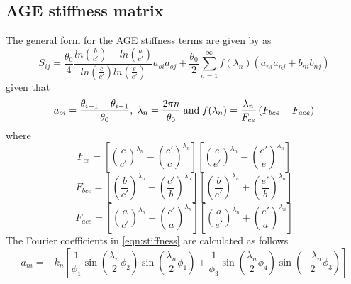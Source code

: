 \subsection{AGE stiffness matrix}
\label{AGE_stiffness}
The general form for the AGE stiffness terms are given by \cite{razek_1982} as
\begin{equation}\label{eqn:stiffness}
    S_{ij}=\frac{\theta_{0}}{4}\frac
    {ln\left(\frac{b}{c'}\right) - ln\left(\frac{a}{c'}\right)}
    {ln\left(\frac{c}{c'}\right)   ln\left(\frac{e}{e'}\right)}a_{oi}a_{oj} +
    \frac{\theta_{0}}{2}\sum^{\infty}_{n=1}f(\lambda_{n})
    \left(a_{ni}a_{nj}+b_{ni}b_{nj}\right)
\end{equation}
given that
\begin{equation}\label{eqn:func_aoi_lambda}
    a_{oi}=\frac{\theta_{i+1}-\theta_{i-1}}{\theta_{0}}, \; 
    \lambda_{n}=\frac{2\pi n}{\theta_{0}}
    \; \textnormal{and} \;
    f(\lambda_{n})=\frac{\lambda_{n}}{F_{ce}}\left(F_{bce}-F_{ace}\right)
\end{equation}
where
\begin{equation}\label{eqn:fce}
    F_{ce}=
    \left[ 
        \left(\frac{c}{c'}\right)^{\lambda_{n}}-
        \left(\frac{c'}{c}\right)^{\lambda_{n}}  
    \right]
    \left[ 
        \left(\frac{e}{e'}\right)^{\lambda_{n}}-
        \left(\frac{e'}{e}\right)^{\lambda_{n}}
    \right] \nonumber
\end{equation}
\begin{equation}
\label{eqn:fbce}
	F_{bce}= 
	  \left[ 
	    \left(\frac{b}{c'}\right)^{\lambda_{n}}-
	    \left(\frac{c'}{b}\right)^{\lambda_{n}}
	  \right]  
	  \left[
	    \left(\frac{b}{e'}\right)^{\lambda_{n}}+
	    \left(\frac{e'}{b}\right)^{\lambda_{n}}
	  \right]	\nonumber   
\end{equation}
\begin{equation}
\label{eqn:face}
	F_{ace}=
	   \left[
	     \left(\frac{a}{c'}\right)^{\lambda_{n}}-
	     \left(\frac{c'}{a}\right)^{\lambda_{n}}
	   \right]
	   \left[
	     \left(\frac{a}{e'}\right)^{\lambda_{n}}+
	     \left(\frac{e'}{a}\right)^{\lambda_{n}}
	   \right] \nonumber
\end{equation}
The Fourier coefficients in \eqref{eqn:stiffness} are calculated as follows
\begin{equation}\label{eqn:ani}
    a_{ni}=-k_{n}
    \left[
        \frac{1}{\phi_{1}}
        \sin\left(\frac{\lambda_{n}}{2}\phi_{2}\right) 
        \sin\left(\frac{\lambda_{n}}{2}\phi_{1}\right)+ 
        \frac{1}{\phi_{3}}
        \sin\left(\frac{\lambda_{n}}{2}\phi_{4}\right)
        \sin\left(\frac{-\lambda_{n}}{2}\phi_{3}\right)
    \right]
\end{equation}
